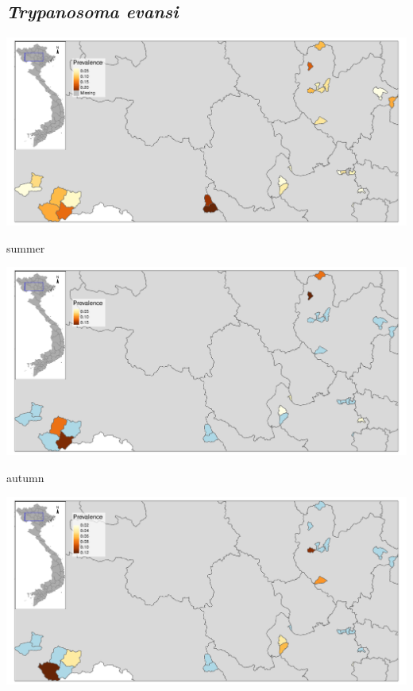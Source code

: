 \subsection{\textit{Trypanosoma evansi}}
\begin{frame}
\begin{center}
\includegraphics[width=1\textwidth]{map06.pdf}
\end{center}
\end{frame}

\begin{frame}
summer\\
\begin{center}
\includegraphics[width=1\textwidth]{map06_summer.pdf}
\end{center}
\end{frame}


\begin{frame}
autumn\\
\begin{center}
\includegraphics[width=1\textwidth]{map06_autumn.pdf}
\end{center}
\end{frame}

